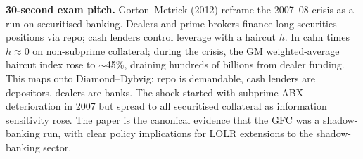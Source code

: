 \documentclass[11pt]{article}
\begin{document}
\begin{keybox}
\textbf{30-second exam pitch.} Gorton--Metrick (2012) reframe the 2007--08 crisis as a run on securitised banking. Dealers and prime brokers finance long securities positions via repo; cash lenders control leverage with a haircut $h$. In calm times $h\approx 0$ on non-subprime collateral; during the crisis, the GM weighted-average haircut index rose to $\sim$45\%, draining hundreds of billions from dealer funding. This maps onto Diamond--Dybvig: repo is demandable, cash lenders are depositors, dealers are banks. The shock started with subprime ABX deterioration in 2007 but spread to all securitised collateral as information sensitivity rose. The paper is the canonical evidence that the GFC was a shadow-banking run, with clear policy implications for LOLR extensions to the shadow-banking sector.
\end{keybox}
\end{document}
